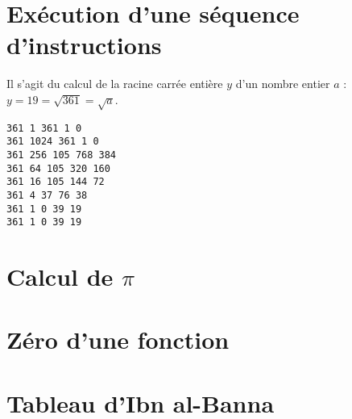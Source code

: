 \documentclass[11pt,a4paper]{article}
\begin{document}

\section{Exécution d'une séquence d'instructions}
%

\noindent\begin{minipage}{8cm}
Il s'agit du calcul de la racine carrée entière $y$ d'un nombre entier $a$ :
$y = 19 = \sqrt{361} = \sqrt{a}$.
\end{minipage}
\hfill
\begin{py}{7cm}
\begin{verbatim}
361 1 361 1 0
361 1024 361 1 0
361 256 105 768 384
361 64 105 320 160
361 16 105 144 72
361 4 37 76 38
361 1 0 39 19
361 1 0 39 19
\end{verbatim}
\end{py}

\section{Calcul de $\pi$}


\section{Zéro d'une fonction}


\section{Tableau d'Ibn al-Banna}

\label{fini}
\end{document}
